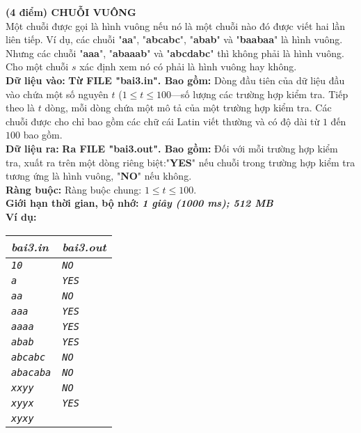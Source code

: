 \begin{ex}
	\textbf{(4 điểm) CHUỖI VUÔNG}\\
	Một chuỗi được gọi là hình vuông nếu nó là một chuỗi nào đó được viết hai lần liên tiếp. Ví dụ, các chuỗi "\textbf{aa}", "\textbf{abcabc}", "\textbf{abab}" và "\textbf{baabaa}" là hình vuông. Nhưng các chuỗi "\textbf{aaa}", "\textbf{abaaab}" và "\textbf{abcdabc}" thì không phải là hình vuông. Cho một chuỗi $s$ xác định xem nó có phải là hình vuông hay không.\\
	\textbf{Dữ liệu vào: }\textbf{Từ FILE "bai3.in". Bao gồm: }Dòng đầu tiên của dữ liệu đầu vào chứa một số nguyên $t$ ($1 \le t \le 100$—số lượng các trường hợp kiểm tra. Tiếp theo là $t$ dòng, mỗi dòng chứa một mô tả của một trường hợp kiểm tra. Các chuỗi được cho chỉ bao gồm các chữ cái Latin viết thường và có độ dài từ $1$ đến $100$ bao gồm.\\
	\textbf{Dữ liệu ra: }\textbf{Ra FILE "bai3.out". Bao gồm: }Đối với mỗi trường hợp kiểm tra, xuất ra trên một dòng riêng biệt:"\textbf{YES}" nếu chuỗi trong trường hợp kiểm tra tương ứng là hình vuông, "\textbf{NO}" nếu không.\\
	\textbf{Ràng buộc: } Ràng buộc chung: $1 \leq t \leq 100$. \\
	\textbf{Giới hạn thời gian, bộ nhớ: } \textbf{\textit{1 giây (1000 ms); 512 MB}} \\
	\textbf{Ví dụ: }
	\begin{center}
		\begin{tabular}{|l|l|}
			\hline
			\textbf{\textsf{\textit{bai3.in}}} & \textbf{\textsf{\textit{bai3.out}}} \\ %
			\hline
			\textit{\texttt{10}}               & \textit{\texttt{NO}}                \\ %
			\textit{\texttt{a}}                & \textit{\texttt{YES}}               \\ %
			\textit{\texttt{aa}}               & \textit{\texttt{NO}}                \\ %
			\textit{\texttt{aaa}}              & \textit{\texttt{YES}}               \\ %
			\textit{\texttt{aaaa}}             & \textit{\texttt{YES}}               \\
			\textit{\texttt{abab}}             & \textit{\texttt{YES}}               \\
			\textit{\texttt{abcabc}}           & \textit{\texttt{NO}}                \\
			\textit{\texttt{abacaba}}          & \textit{\texttt{NO}}                \\
			\textit{\texttt{xxyy}}             & \textit{\texttt{NO}}                \\
			\textit{\texttt{xyyx}}             & \textit{\texttt{YES}}               \\
			\textit{\texttt{xyxy}}             &                                     \\
			\hline
		\end{tabular}
	\end{center}
\end{ex}

